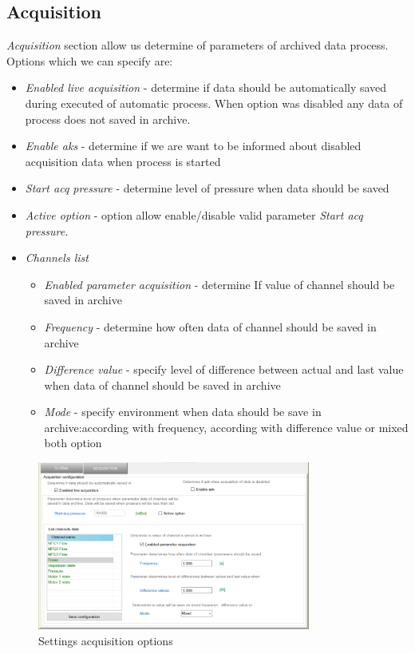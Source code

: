 \subsection{Acquisition}

\textit{Acquisition} section allow us determine of parameters of archived data process. Options which we can specify are:

\begin{itemize}
	\item \textit{Enabled live acquisition} - determine if data should be automatically saved during executed of automatic  process. When option was disabled any data of process does not saved in archive.
	\item \textit{Enable aks} - determine if we are want to be informed about disabled acquisition data when process is started
	\item \textit{Start acq pressure} - determine level of pressure when data should be saved
	\item \textit{Active option} - option allow enable/disable valid parameter \textit{Start acq pressure.}
	\item \textit {Channels list}
	\begin{itemize}
		\item \textit{Enabled parameter acquisition} - determine If value of channel should be saved in archive
		\item \textit{Frequency} - determine how often data of channel should be saved in archive
		\item \textit{Difference value} - specify level of difference between actual and last value when data of channel should be saved in archive
		\item \textit{Mode} - specify environment when data should be save in archive:according with frequency, according with difference value or mixed both option
	\end{itemize}
\end{itemize} 


	\begin{figure}[!h] 
	\centering \includegraphics[width=0.8\textwidth]{Graphic/Settings/SettingsAcq.png}	
	\caption{Settings acquisition options}
	\label{settings_acquisition_options}
	\end{figure}
	\FloatBarrier

